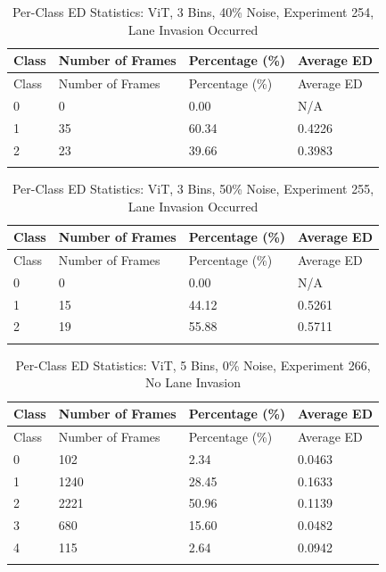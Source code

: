 
\begin{longtable}{@{}llll@{}}
\toprule
Class & Number of Frames & Percentage (\%) & Average ED \\
\midrule
\endfirsthead
\toprule
Class & Number of Frames & Percentage (\%) & Average ED \\
\midrule
\endhead
0 & 0 & 0.00 & N/A \\
1 & 35 & 60.34 & 0.4226 \\
2 & 23 & 39.66 & 0.3983 \\
\bottomrule
\caption{Per-Class ED Statistics: ViT, 3 Bins, 40\% Noise, Experiment 254, Lane Invasion Occurred}
\label{tab:exp254_ViT_3bins_40noise}
\end{longtable}
        


\begin{longtable}{@{}llll@{}}
\toprule
Class & Number of Frames & Percentage (\%) & Average ED \\
\midrule
\endfirsthead
\toprule
Class & Number of Frames & Percentage (\%) & Average ED \\
\midrule
\endhead
0 & 0 & 0.00 & N/A \\
1 & 15 & 44.12 & 0.5261 \\
2 & 19 & 55.88 & 0.5711 \\
\bottomrule
\caption{Per-Class ED Statistics: ViT, 3 Bins, 50\% Noise, Experiment 255, Lane Invasion Occurred}
\label{tab:exp255_ViT_3bins_50noise}
\end{longtable}
        


\begin{longtable}{@{}llll@{}}
\toprule
Class & Number of Frames & Percentage (\%) & Average ED \\
\midrule
\endfirsthead
\toprule
Class & Number of Frames & Percentage (\%) & Average ED \\
\midrule
\endhead
0 & 102 & 2.34 & 0.0463 \\
1 & 1240 & 28.45 & 0.1633 \\
2 & 2221 & 50.96 & 0.1139 \\
3 & 680 & 15.60 & 0.0482 \\
4 & 115 & 2.64 & 0.0942 \\
\bottomrule
\caption{Per-Class ED Statistics: ViT, 5 Bins, 0\% Noise, Experiment 266, No Lane Invasion}
\label{tab:exp266_ViT_5bins_0noise}
\end{longtable}
        

